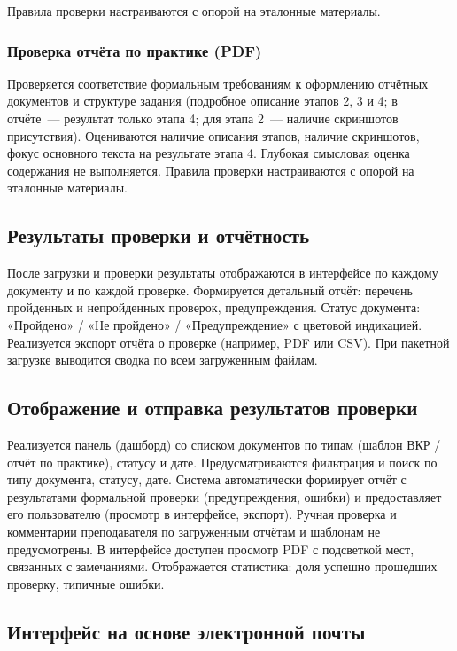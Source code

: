 Правила проверки настраиваются с опорой на эталонные материалы.

\subsubsection{Проверка отчёта по практике (PDF)}

Проверяется соответствие формальным требованиям к оформлению отчётных документов и структуре задания (подробное описание этапов 2, 3 и 4; в отчёте~--- результат только этапа 4; для этапа 2~--- наличие скриншотов присутствия). Оцениваются наличие описания этапов, наличие скриншотов, фокус основного текста на результате этапа 4. Глубокая смысловая оценка содержания не выполняется. Правила проверки настраиваются с опорой на эталонные материалы.

\subsection{Результаты проверки и отчётность}

После загрузки и проверки результаты отображаются в интерфейсе по каждому документу и по каждой проверке. Формируется детальный отчёт: перечень пройденных и непройденных проверок, предупреждения. Статус документа: «Пройдено» / «Не пройдено» / «Предупреждение» с цветовой индикацией. Реализуется экспорт отчёта о проверке (например, PDF или CSV). При пакетной загрузке выводится сводка по всем загруженным файлам.

\subsection{Отображение и отправка результатов проверки}

Реализуется панель (дашборд) со списком документов по типам (шаблон ВКР / отчёт по практике), статусу и дате. Предусматриваются фильтрация и поиск по типу документа, статусу, дате. Система автоматически формирует отчёт с результатами формальной проверки (предупреждения, ошибки) и предоставляет его пользователю (просмотр в интерфейсе, экспорт). Ручная проверка и комментарии преподавателя по загруженным отчётам и шаблонам не предусмотрены. В интерфейсе доступен просмотр PDF с подсветкой мест, связанных с замечаниями. Отображается статистика: доля успешно прошедших проверку, типичные ошибки.

\subsection{Интерфейс на основе электронной почты}

